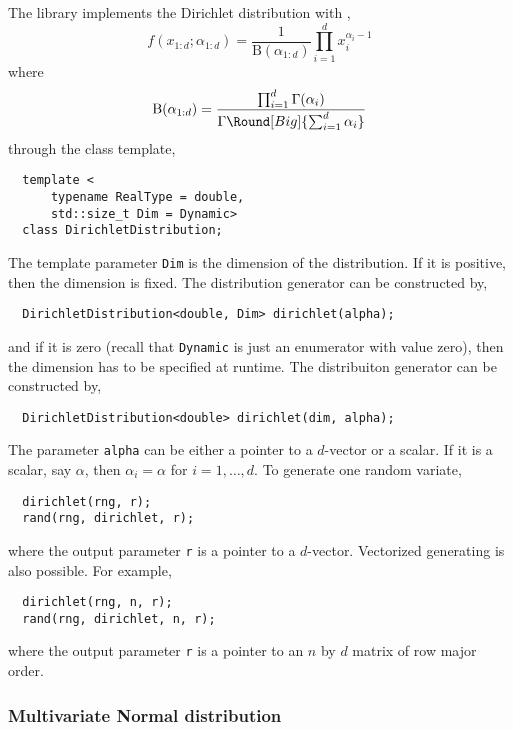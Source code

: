 The library implements the Dirichlet distribution with \pdf,
\begin{equation*}
  f(x_{1:d};\alpha_{1:d}) = \frac{1}{\mathrm{B}(\alpha_{1:d})}
  \prod_{i=1}^d x_i^{\alpha_i - 1}
\end{equation*}
where
\begin{equation*}
  \mathrm{B}(\alpha_{1:d}) =
  \frac{\prod_{i=1}^d\Gamma(\alpha_i)}
  {\Gamma\Round[Big]{\sum_{i=1}^d\alpha_i}}
\end{equation*}
through the class template,
\begin{Verbatim}
  template <
      typename RealType = double,
      std::size_t Dim = Dynamic>
  class DirichletDistribution;
\end{Verbatim}
The template parameter \verb|Dim| is the dimension of the distribution. If it
is positive, then the dimension is fixed. The distribution generator can be
constructed by,
\begin{Verbatim}
  DirichletDistribution<double, Dim> dirichlet(alpha);
\end{Verbatim}
and if it is zero (recall that \verb|Dynamic| is just an enumerator with value
zero), then the dimension has to be specified at runtime. The distribuiton
generator can be constructed by,
\begin{Verbatim}
  DirichletDistribution<double> dirichlet(dim, alpha);
\end{Verbatim}
The parameter \verb|alpha| can be either a pointer to a $d$-vector or a scalar.
If it is a scalar, say $\alpha$, then $\alpha_i = \alpha$ for $i = 1,\dots,d$.
To generate one random variate,
\begin{Verbatim}
  dirichlet(rng, r);
  rand(rng, dirichlet, r);
\end{Verbatim}
where the output parameter \verb|r| is a pointer to a $d$-vector. Vectorized
generating is also possible. For example,
\begin{Verbatim}
  dirichlet(rng, n, r);
  rand(rng, dirichlet, n, r);
\end{Verbatim}
where the output parameter \verb|r| is a pointer to an $n$ by $d$ matrix of row
major order.

\subsubsection{Multivariate Normal distribution}

